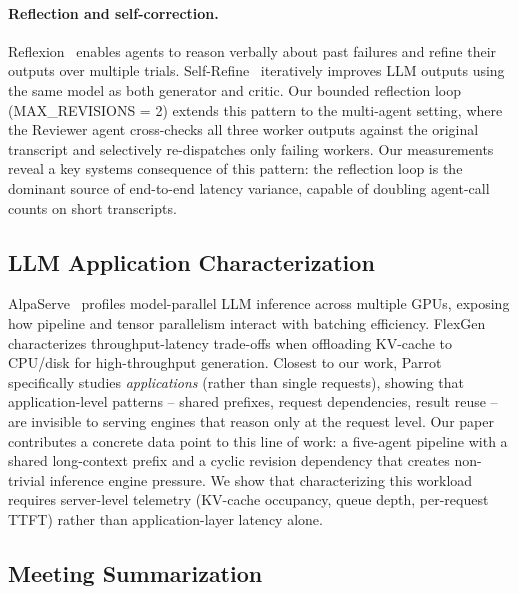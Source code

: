 \paragraph{Reflection and self-correction.}
Reflexion~\cite{shinn2023reflexion} enables agents to reason verbally about
past failures and refine their outputs over multiple trials.
Self-Refine~\cite{madaan2023selfrefine} iteratively improves LLM outputs
using the same model as both generator and critic.  Our bounded reflection
loop (MAX\_REVISIONS = 2) extends this pattern to the multi-agent setting,
where the Reviewer agent cross-checks all three worker outputs against the
original transcript and selectively re-dispatches only failing workers.
Our measurements reveal a key systems consequence of this pattern:
the reflection loop is the dominant source of end-to-end latency variance,
capable of doubling agent-call counts on short transcripts.

\subsection{LLM Application Characterization}

AlpaServe~\cite{li2023alpaserve} profiles model-parallel LLM inference
across multiple GPUs, exposing how pipeline and tensor parallelism interact
with batching efficiency.  FlexGen~\cite{sheng2023flexgen} characterizes
throughput-latency trade-offs when offloading KV-cache to CPU/disk for
high-throughput generation.  Closest to our work, Parrot~\cite{lin2024parrot}
specifically studies \emph{applications} (rather than single requests),
showing that application-level patterns -- shared prefixes, request
dependencies, result reuse -- are invisible to serving engines that reason
only at the request level.  Our paper contributes a concrete data point to
this line of work: a five-agent pipeline with a shared long-context prefix
and a cyclic revision dependency that creates non-trivial inference
engine pressure.  We show that characterizing this workload requires
server-level telemetry (KV-cache occupancy, queue depth, per-request TTFT)
rather than application-layer latency alone.

\subsection{Meeting Summarization}

